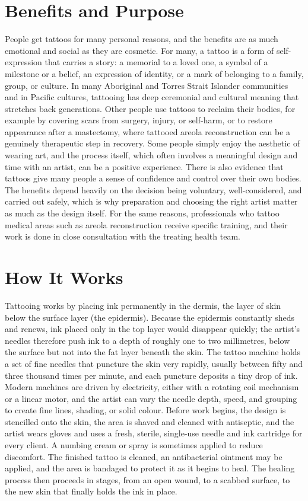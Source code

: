 \section*{Benefits and Purpose}
People get tattoos for many personal reasons, and the benefits are as much emotional and social as they are cosmetic. For many, a tattoo is a form of self-expression that carries a story: a memorial to a loved one, a symbol of a milestone or a belief, an expression of identity, or a mark of belonging to a family, group, or culture. In many Aboriginal and Torres Strait Islander communities and in Pacific cultures, tattooing has deep ceremonial and cultural meaning that stretches back generations. Other people use tattoos to reclaim their bodies, for example by covering scars from surgery, injury, or self-harm, or to restore appearance after a mastectomy, where tattooed areola reconstruction can be a genuinely therapeutic step in recovery. Some people simply enjoy the aesthetic of wearing art, and the process itself, which often involves a meaningful design and time with an artist, can be a positive experience. There is also evidence that tattoos give many people a sense of confidence and control over their own bodies. The benefits depend heavily on the decision being voluntary, well-considered, and carried out safely, which is why preparation and choosing the right artist matter as much as the design itself. For the same reasons, professionals who tattoo medical areas such as areola reconstruction receive specific training, and their work is done in close consultation with the treating health team.

\section*{How It Works}
Tattooing works by placing ink permanently in the dermis, the layer of skin below the surface layer (the epidermis). Because the epidermis constantly sheds and renews, ink placed only in the top layer would disappear quickly; the artist's needles therefore push ink to a depth of roughly one to two millimetres, below the surface but not into the fat layer beneath the skin. The tattoo machine holds a set of fine needles that puncture the skin very rapidly, usually between fifty and three thousand times per minute, and each puncture deposits a tiny drop of ink. Modern machines are driven by electricity, either with a rotating coil mechanism or a linear motor, and the artist can vary the needle depth, speed, and grouping to create fine lines, shading, or solid colour. Before work begins, the design is stencilled onto the skin, the area is shaved and cleaned with antiseptic, and the artist wears gloves and uses a fresh, sterile, single-use needle and ink cartridge for every client. A numbing cream or spray is sometimes applied to reduce discomfort. The finished tattoo is cleaned, an antibacterial ointment may be applied, and the area is bandaged to protect it as it begins to heal. The healing process then proceeds in stages, from an open wound, to a scabbed surface, to the new skin that finally holds the ink in place.

